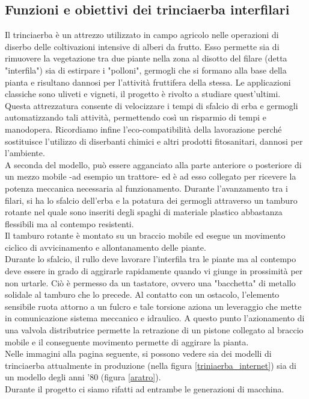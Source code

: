 \documentclass[a4paper,12pt]{article}
\begin{document}
\subsection{Funzioni e obiettivi dei trinciaerba interfilari}
  Il trinciaerba è un attrezzo utilizzato in campo agricolo nelle operazioni di diserbo delle coltivazioni intensive di alberi da frutto. Esso permette sia di rimuovere la vegetazione tra due piante nella zona al disotto del filare (detta "interfila") sia di estirpare i "polloni", germogli che si formano alla base della pianta e risultano dannosi per l'attività fruttifera della stessa. Le applicazioni classiche sono uliveti e vigneti, il progetto è rivolto a studiare quest'ultimi.\\
  Questa attrezzatura consente di velocizzare i tempi di sfalcio di erba e germogli automatizzando tali attività, permettendo così un risparmio di tempi e manodopera. Ricordiamo infine l'eco-compatibilità della lavorazione perché sostituisce l'utilizzo di diserbanti chimici e altri prodotti fitosanitari, dannosi per l'ambiente.\\
  A seconda del modello, può essere agganciato alla parte anteriore o posteriore di un mezzo mobile -ad esempio un trattore- ed è ad esso collegato per ricevere la potenza meccanica necessaria al funzionamento. Durante l'avanzamento tra i filari, si ha lo sfalcio dell'erba e la potatura dei germogli attraverso un tamburo rotante nel quale sono inseriti degli spaghi di materiale plastico abbastanza flessibili ma al contempo resistenti.\\
  Il tamburo rotante è montato su un braccio mobile ed esegue un movimento ciclico di avvicinamento e allontanamento delle piante.\\
  Durante lo sfalcio, il rullo deve lavorare l'interfila tra le piante ma al contempo deve essere in grado di aggirarle rapidamente quando vi giunge in prossimità per non urtarle. Ciò è permesso da un tastatore, ovvero una "bacchetta" di metallo solidale al tamburo che lo precede. Al contatto con un ostacolo, l'elemento sensibile ruota attorno a un fulcro e tale torsione aziona un leveraggio che mette in comunicazione sistema meccanico e idraulico. A questo punto l'azionamento di una valvola distributrice permette la retrazione di un pistone collegato al braccio mobile e il conseguente movimento permette di aggirare la pianta.\\
  Nelle immagini alla pagina seguente, si possono vedere sia dei modelli di trinciaerba attualmente in produzione (nella figura \ref{triniaerba_internet}) sia di un modello degli anni '80 (figura \ref{aratro}).\\
  Durante il progetto ci siamo rifatti ad entrambe le generazioni di macchina.
  
\end{document}
